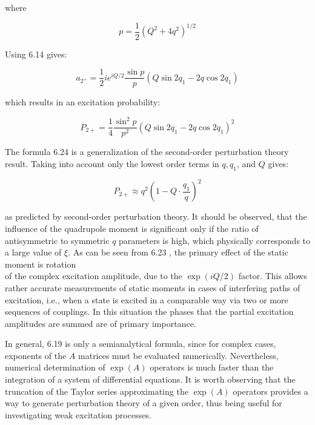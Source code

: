 \documentclass[10pt]{article}
\begin{document}
where

$$
p=\frac{1}{2}\left(Q^{2}+4 q^{2}\right)^{1 / 2}
$$

Using 6.14 gives:


\begin{equation*}
a_{2^{+}}=\frac{1}{2} i e^{i Q / 2} \frac{\sin p}{p}\left(Q \sin 2 q_{1}-2 q \cos 2 q_{1}\right) \tag{6.23}
\end{equation*}


which results in an excitation probability:


\begin{equation*}
P_{2+}=\frac{1}{4} \frac{\sin ^{2} p}{p^{2}}\left(Q \sin 2 q_{1}-2 q \cos 2 q_{1}\right)^{2} \tag{6.24}
\end{equation*}


The formula 6.24 is a generalization of the second-order perturbation theory result. Taking into account only the lowest order terms in $q, q_{1}$, and $Q$ gives:


\begin{equation*}
P_{2+} \approx q^{2}\left(1-Q \cdot \frac{q_{1}}{q}\right)^{2} \tag{6.25}
\end{equation*}


as predicted by second-order perturbation theory. It should be observed, that the influence of the quadrupole moment is significant only if the ratio of antisymmetric to symmetric $q$ parameters is high, which physically corresponds to a large value of $\xi$. As can be seen from 6.23 , the primary effect of the static moment is rotation\\
of the complex excitation amplitude, due to the $\exp (i Q / 2)$ factor. This allows rather accurate measurements of static moments in cases of interfering paths of excitation, i.e., when a state is excited in a comparable way via two or more sequences of couplings. In this situation the phases that the partial excitation amplitudes are summed are of primary importance.

In general, 6.19 is only a semianalytical formula, since for complex cases, exponents of the $A$ matrices must be evaluated numerically. Nevertheless, numerical determination of $\exp (A)$ operators is much faster than the integration of a system of differential equations. It is worth observing that the truncation of the Taylor series approximating the $\exp (A)$ operators provides a way to generate perturbation theory of a given order, thus being useful for investigating weak excitation processes.
\end{document}
